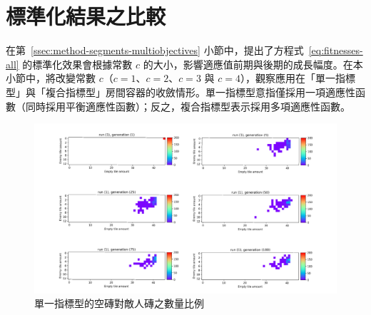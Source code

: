 \section{標準化結果之比較}
\label{sec:experiment-normalized}

在第~\ref{ssec:method-segments-multiobjectives} 小節中，提出了方程式~\ref{eq:fitnesses-all} 的標準化效果會根據常數 $c$ 的大小，影響適應值前期與後期的成長幅度。在本小節中，將改變常數 $c$（$c = 1$、$c = 2$、$c = 3$ 與 $c = 4$），觀察應用在「單一指標型」與「複合指標型」房間容器的收斂情形。單一指標型意指僅採用一項適應性函數（同時採用平衡適應性函數）；反之，複合指標型表示採用多項適應性函數。



\begin{figure}[H]
  \begin{center}
    \includegraphics[width=1.0\textwidth]{figures/experiments/experiment-normalized-single-heatmap.pdf}
    \caption{單一指標型的空磚對敵人磚之數量比例} 
    \label{fig:experiment-normalized-single-heatmap}
  \end{center}
\end{figure}


